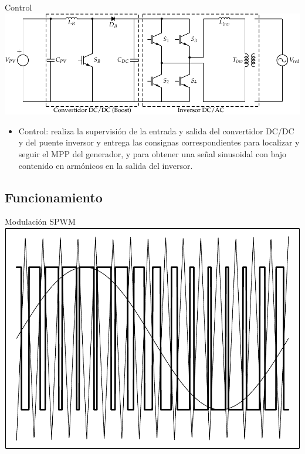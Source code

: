 \documentclass[xcolor={usenames,svgnames,dvipsnames}]{beamer}
\begin{document}
\begin{frame}[label=sec-2-4-3]{Control}
\includegraphics[width=.9\linewidth]{../figs/InversorPV.pdf}

\begin{itemize}
\item \alert{Control}: realiza la supervisión de la entrada y salida del
convertidor DC/DC y del puente inversor y entrega las consignas
correspondientes para localizar y seguir el MPP del generador, y para
obtener una señal sinusoidal con bajo contenido en armónicos en la
salida del inversor.
\end{itemize}
\end{frame}

\subsection{Funcionamiento}
\label{sec-2-5}
\begin{frame}[label=sec-2-5-1]{Modulación SPWM}
\includegraphics[width=.9\linewidth]{../figs/SPWMMonofasico.pdf}
\end{frame}
\end{document}
